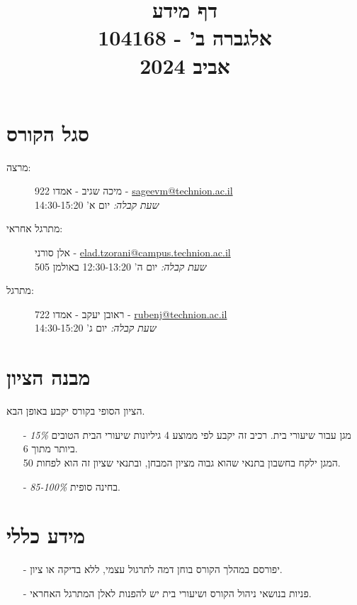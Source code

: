 \documentclass{article}
\title{דף מידע \\ אלגברה ב' - 104168 \\ אביב 2024}
\date{}
\begin{document}
\maketitle

\section*{סגל הקורס}

\begin{description}
\item[מרצה:]
מיכה שגיב
-
אמדו 922
-
\textenglish{\href{mailto:sageevm@technion.ac.il}{sageevm@technion.ac.il}}
\\
\emph{שעת קבלה:}
יום א' 14:30-15:20
\item[מתרגל אחראי:] 
אלן סורני
-
\textenglish{\href{mailto:elad.tzorani@campus.technion.ac.il}{elad.tzorani@campus.technion.ac.il}}
\\
\emph{שעת קבלה:}
יום ה' 12:30-13:20
באולמן 505
\item[מתרגל:] 
ראובן יעקב
-
אמדו 722
-
\textenglish{\href{mailto:rubenj@technion.ac.il}{rubenj@technion.ac.il}}
\\
\emph{שעת קבלה:}
יום ג' 14:30-15:20
\end{description}

\section*{מבנה הציון}

הציון הסופי בקורס יקבע באופן הבא.

\begin{itemize}
\item[-] \emph{15\%}
מגן עבור שיעורי בית. רכיב זה יקבע לפי ממוצע 4 גיליונות שיעורי הבית הטובים ביותר מתוך 6.
\\
המגן ילקח בחשבון בתנאי שהוא גבוה מציון המבחן, ובתנאי שציון זה הוא לפחות 50.
\item[-] \emph{85-100\%}
בחינה סופית.
\end{itemize}

\section*{מידע כללי}

\begin{itemize}
\item[-]
יפורסם במהלך הקורס בוחן דמה לתרגול עצמי, ללא בדיקה או ציון.
\item[-]
פניות בנושאי ניהול הקורס ושיעורי בית יש להפנות לאלן המתרגל האחראי.
\end{itemize}
\end{document}
